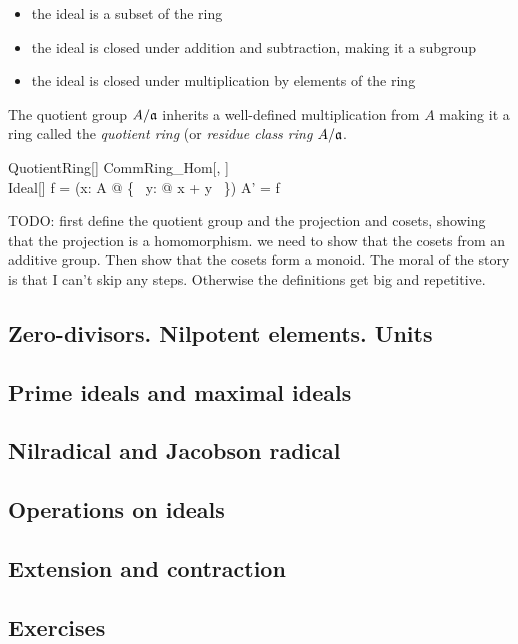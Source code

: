\documentclass{amsart}
\begin{document}
\begin{itemize}
	\item the ideal is a subset of the ring
	\item the ideal is closed under addition and subtraction, making it a subgroup
	\item the ideal is closed under multiplication by elements of the ring
\end{itemize}

The quotient group $A/\mathfrak{a}$ inherits a well-defined multiplication from $A$
making it a ring called the \textit{quotient ring} (or \textit{residue class ring} $A/\mathfrak{a}$.

\begin{schema}{QuotientRing}[\genT]
	CommRing\_Hom[\genT, \power \genT] \\
	Ideal[\genT]
\where
	f = (\lambda x: A @ \{~ y: \fraka @ x + y ~\})
\also
	A' = \ran f
\end{schema}

TODO: first define the quotient group and the projection and cosets, showing that the projection
is a homomorphism. we need to show that the cosets from an additive group.
Then show that the cosets form a monoid.
The moral of the story is that I can't skip any steps. Otherwise the definitions get big and repetitive.

\subsection{Zero-divisors. Nilpotent elements. Units}

\subsection{Prime ideals and maximal ideals}

\subsection{Nilradical and Jacobson radical}

\subsection{Operations on ideals}

\subsection{Extension and contraction}

\subsection{Exercises}

\printbibliography
\end{document}

